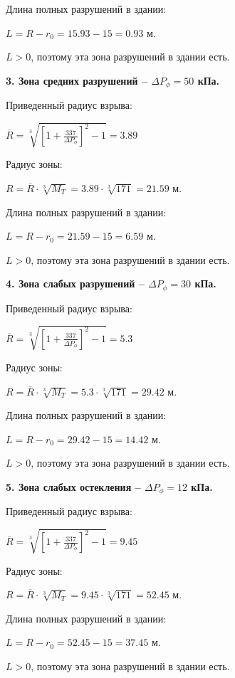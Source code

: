 \documentclass[a4paper,14pt]{article}
\begin{document}
Длина полных разрушений в здании:

$L = R - r_0 = 15.93 - 15 = 0.93$ м.

$L > 0$, поэтому эта зона разрушений в здании есть.

\textbf{3. Зона средних разрушений -- $\Delta P_{\phi} = 50$ кПа.}

Приведенный радиус взрыва:

$\overline{R} = \sqrt[3]{\left[ 1 + \frac{337}{\Delta P_{\phi}} \right]^2 - 1} = 3.89$

Радиус зоны:

$R = \overline{R} \cdot \sqrt[3]{M_{T}} = 3.89 \cdot \sqrt[3]{171} = 21.59$ м.

Длина полных разрушений в здании:

$L = R - r_0 = 21.59 - 15 = 6.59$ м.

$L > 0$, поэтому эта зона разрушений в здании есть.

\textbf{4. Зона слабых разрушений -- $\Delta P_{\phi} = 30$ кПа.}

Приведенный радиус взрыва:

$\overline{R} = \sqrt[3]{\left[ 1 + \frac{337}{\Delta P_{\phi}} \right]^2 - 1} = 5.3$

Радиус зоны:

$R = \overline{R} \cdot \sqrt[3]{M_{T}} = 5.3 \cdot \sqrt[3]{171} = 29.42$ м.

Длина полных разрушений в здании:

$L = R - r_0 = 29.42 - 15 = 14.42$ м.

$L > 0$, поэтому эта зона разрушений в здании есть.


\textbf{5. Зона слабых остекления -- $\Delta P_{\phi} = 12$ кПа.}

Приведенный радиус взрыва:

$\overline{R} = \sqrt[3]{\left[ 1 + \frac{337}{\Delta P_{\phi}} \right]^2 - 1} = 9.45$

Радиус зоны:

$R = \overline{R} \cdot \sqrt[3]{M_{T}} = 9.45 \cdot \sqrt[3]{171} = 52.45$ м.

Длина полных разрушений в здании:

$L = R - r_0 = 52.45 - 15 = 37.45$ м.

$L > 0$, поэтому эта зона разрушений в здании есть.
\end{document}
